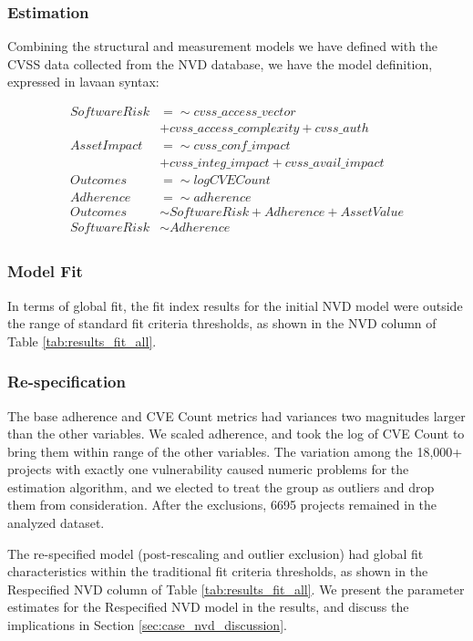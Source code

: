 \subsubsection{Estimation}

Combining the structural and measurement models we have defined with the CVSS data collected from the NVD database, we have the model definition, expressed in lavaan syntax: 

\begin{equation}
\begin{split}
	SoftwareRisk &=\sim cvss\_access\_vector \\ 
	&+ cvss\_access\_complexity + cvss\_auth\\
	AssetImpact &=\sim cvss\_conf\_impact\\
	&+ cvss\_integ\_impact + cvss\_avail\_impact\\
	Outcomes &=\sim logCVECount\\
	Adherence &=\sim adherence\\
	Outcomes &\sim SoftwareRisk + Adherence + AssetValue\\
	SoftwareRisk &\sim Adherence\\
\end{split}
\end{equation}		

\subsubsection{Model Fit} 
In terms of global fit, the fit index results for the initial NVD model were outside the range of standard fit criteria thresholds, as shown in the NVD column of Table \ref{tab:results_fit_all}. 

\subsubsection{Re-specification}
The base adherence and CVE Count metrics had variances two magnitudes larger than the other variables. We scaled adherence, and took the log of CVE Count to bring them within range of the other variables. The variation among the 18,000+ projects with exactly one vulnerability caused numeric problems for the estimation algorithm, and we elected to treat the group as outliers and drop them from consideration. After the exclusions, 6695 projects remained in the analyzed dataset.

The re-specified model (post-rescaling and outlier exclusion) had global fit characteristics within the traditional fit criteria thresholds, as shown in the Respecified NVD column of Table \ref{tab:results_fit_all}. We present the parameter estimates for the Respecified NVD model in the results, and discuss the implications in Section \ref{sec:case_nvd_discussion}.

